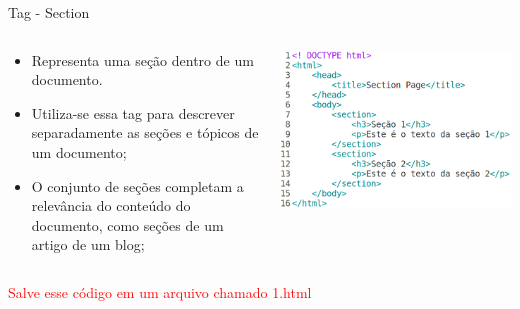 \documentclass{beamer}
\begin{document}
\begin{frame}{Tag - Section}
  \begin{columns}
    \begin{column}{0.4 \textwidth}
      \footnotesize
      \begin{itemize}
	\item Representa uma seção dentro de um documento.
	 \item Utiliza-se essa tag para descrever separadamente as seções 
e tópicos de um documento;
	 \item O conjunto de seções completam a relevância do conteúdo do 
documento, como seções de um artigo de um blog;
      \end{itemize}
    \end{column}
    \begin{column}{0.6\textwidth}
     \includegraphics[height=0.4\paperheight]{fig/aula1/html16.png}
    \end{column}
  \end{columns}
  \textcolor{red}{Salve esse código em um arquivo chamado 1.html}
\end{frame}
\end{document}
